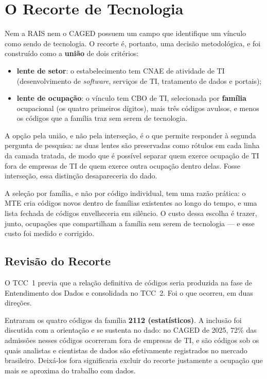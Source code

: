 \section{O Recorte de Tecnologia}
\label{sec:recorte}

Nem a RAIS nem o CAGED possuem um campo que identifique um vínculo como sendo de tecnologia. O recorte é, portanto, uma decisão metodológica, e foi construído como a \textbf{união} de dois critérios:

\begin{itemize}
    \item \textbf{lente de setor}: o estabelecimento tem CNAE de atividade de TI (desenvolvimento de \textit{software}, serviços de TI, tratamento de dados e portais);
    \item \textbf{lente de ocupação}: o vínculo tem CBO de TI, selecionada por \textbf{família} ocupacional (os quatro primeiros dígitos), mais três códigos avulsos, e menos os códigos que a família traz sem serem de tecnologia.
\end{itemize}

A opção pela união, e não pela interseção, é o que permite responder à segunda pergunta de pesquisa: as duas lentes são preservadas como rótulos em cada linha da camada tratada, de modo que é possível separar quem exerce ocupação de TI fora de empresas de TI de quem exerce outra ocupação dentro delas. Fosse interseção, essa distinção desapareceria do dado.

A seleção por família, e não por código individual, tem uma razão prática: o MTE cria códigos novos dentro de famílias existentes ao longo do tempo, e uma lista fechada de códigos envelheceria em silêncio. O custo dessa escolha é trazer, junto, ocupações que compartilham a família sem serem de tecnologia --- e esse custo foi medido e corrigido.

\subsection{Revisão do Recorte}
\label{subsec:revisao-recorte}

O TCC~1 previa que a relação definitiva de códigos seria produzida na fase de Entendimento dos Dados e consolidada no TCC~2. Foi o que ocorreu, em duas direções.

Entraram os quatro códigos da família \textbf{2112 (estatísticos)}. A inclusão foi discutida com a orientação e se sustenta no dado: no CAGED de 2025, 72\% das admissões nesses códigos ocorreram fora de empresas de TI, e são códigos sob os quais analistas e cientistas de dados são efetivamente registrados no mercado brasileiro. Deixá-los fora significaria excluir do recorte justamente a ocupação que mais se aproxima do trabalho com dados.

